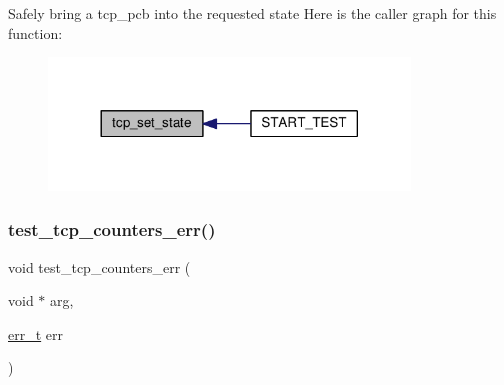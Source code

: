 Safely bring a tcp\+\_\+pcb into the requested state Here is the caller graph for this function\+:
\nopagebreak
\begin{figure}[H]
\begin{center}
\leavevmode
\includegraphics[width=272pt]{openmote-cc2538_2lwip_2test_2unit_2tcp_2tcp__helper_8h_a39f3f73a5ac75fb0de5253cc0a1da423_icgraph}
\end{center}
\end{figure}
\mbox{\label{openmote-cc2538_2lwip_2test_2unit_2tcp_2tcp__helper_8h_a3ddbc387487935205c08c161223031c7}} 
\subsubsection{\texorpdfstring{test\+\_\+tcp\+\_\+counters\+\_\+err()}{test\_tcp\_counters\_err()}}
{\footnotesize\ttfamily void test\+\_\+tcp\+\_\+counters\+\_\+err (\begin{DoxyParamCaption}\item[{void $\ast$}]{arg,  }\item[{\hyperlink{group__infrastructure__errors_gaf02d9da80fd66b4f986d2c53d7231ddb}{err\+\_\+t}}]{err }\end{DoxyParamCaption})}

